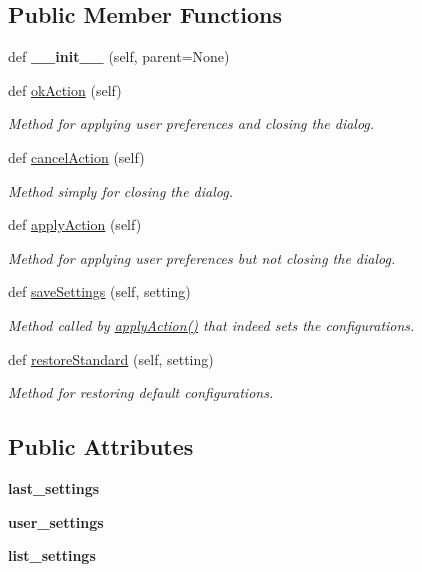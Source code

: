 \subsection*{Public Member Functions}
\begin{DoxyCompactItemize}
\item 
\hypertarget{a00109_af773a0c74e666c299d2334a21966f8c9}{}\label{a00109_af773a0c74e666c299d2334a21966f8c9} 
def {\bfseries \+\_\+\+\_\+init\+\_\+\+\_\+} (self, parent=None)
\item 
def \hyperlink{a00109_a7e99113696fefa62dfdeb2ba1279350c}{ok\+Action} (self)
\begin{DoxyCompactList}\small\item\em Method for applying user preferences and closing the dialog. \end{DoxyCompactList}\item 
def \hyperlink{a00109_af92de31fcc110a9892dc2914efb6b46f}{cancel\+Action} (self)
\begin{DoxyCompactList}\small\item\em Method simply for closing the dialog. \end{DoxyCompactList}\item 
def \hyperlink{a00109_a8938a7b43ca7c5496a0ae7bf8d6a0c54}{apply\+Action} (self)
\begin{DoxyCompactList}\small\item\em Method for applying user preferences but not closing the dialog. \end{DoxyCompactList}\item 
def \hyperlink{a00109_a9cfbfd7abab4ba14d80c573a0534040b}{save\+Settings} (self, setting)
\begin{DoxyCompactList}\small\item\em Method called by \hyperlink{a00109_a8938a7b43ca7c5496a0ae7bf8d6a0c54}{apply\+Action()} that indeed sets the configurations. \end{DoxyCompactList}\item 
def \hyperlink{a00109_ab74be9049535f502252efb2df560ac8e}{restore\+Standard} (self, setting)
\begin{DoxyCompactList}\small\item\em Method for restoring default configurations. \end{DoxyCompactList}\end{DoxyCompactItemize}
\subsection*{Public Attributes}
\begin{DoxyCompactItemize}
\item 
\hypertarget{a00109_a8904394496c57e265ab1cf0346b025d9}{}\label{a00109_a8904394496c57e265ab1cf0346b025d9} 
{\bfseries last\+\_\+settings}
\item 
\hypertarget{a00109_a0a02958126e9787f79af1a0f45fab30c}{}\label{a00109_a0a02958126e9787f79af1a0f45fab30c} 
{\bfseries user\+\_\+settings}
\item 
\hypertarget{a00109_aec84d483efd9155fc73699fe365ac9c2}{}\label{a00109_aec84d483efd9155fc73699fe365ac9c2} 
{\bfseries list\+\_\+settings}
\end{DoxyCompactItemize}


